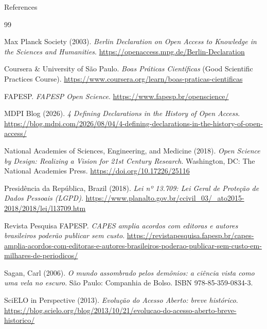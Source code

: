 \documentclass[aspectratio=169]{beamer}
\begin{document}
\begin{frame}[allowframebreaks]{References}
  \scriptsize
  \begin{thebibliography}{99}
  
    Max Planck Society (2003).
    \newblock \textit{Berlin Declaration on Open Access to Knowledge in the Sciences and Humanities}.
    \newblock \url{https://openaccess.mpg.de/Berlin-Declaration}

    Coursera \& University of São Paulo.
    \newblock \textit{Boas Práticas Científicas} (Good Scientific Practices Course).
    \newblock \url{https://www.coursera.org/learn/boas-praticas-cientificas}

    FAPESP.
    \newblock \textit{FAPESP Open Science}.
    \newblock \url{https://www.fapesp.br/openscience/}

    MDPI Blog (2026).
    \newblock \textit{4 Defining Declarations in the History of Open Access}.
    \newblock \url{https://blog.mdpi.com/2026/08/04/4-defining-declarations-in-the-history-of-open-access/}

    National Academies of Sciences, Engineering, and Medicine (2018).
    \newblock \textit{Open Science by Design: Realizing a Vision for 21st Century Research}.
    \newblock Washington, DC: The National Academies Press. \url{https://doi.org/10.17226/25116}

    Presidência da República, Brazil (2018).
    \newblock \textit{Lei nº 13.709: Lei Geral de Proteção de Dados Pessoais (LGPD)}.
    \newblock \url{https://www.planalto.gov.br/ccivil_03/_ato2015-2018/2018/lei/l13709.htm}
    
    Revista Pesquisa FAPESP.
    \newblock \textit{CAPES amplia acordos com editoras e autores brasileiros poderão publicar sem custo}.
    \newblock \url{https://revistapesquisa.fapesp.br/capes-amplia-acordos-com-editoras-e-autores-brasileiros-poderao-publicar-sem-custo-em-milhares-de-periodicos/}

    Sagan, Carl (2006).
    \newblock \textit{O mundo assombrado pelos demônios: a ciência vista como uma vela no escuro}.
    \newblock São Paulo: Companhia de Bolso. ISBN 978-85-359-0834-3.

    SciELO in Perspective (2013).
    \newblock \textit{Evolução do Acesso Aberto: breve histórico}.
    \newblock \url{https://blog.scielo.org/blog/2013/10/21/evolucao-do-acesso-aberto-breve-historico/}


\end{thebibliography}
\end{frame}
\end{document}

